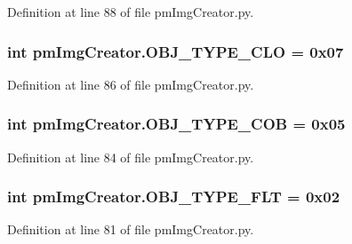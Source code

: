 Definition at line 88 of file pm\-Img\-Creator.\-py.

\hypertarget{namespacepm_img_creator_af1f3b6f0bb8db8e16b64ed3c04ad6215}{
\subsubsection[{O\-B\-J\-\_\-\-T\-Y\-P\-E\-\_\-\-C\-L\-O}]{\setlength{\rightskip}{0pt plus 5cm}int pm\-Img\-Creator.\-O\-B\-J\-\_\-\-T\-Y\-P\-E\-\_\-\-C\-L\-O = 0x07}}\label{namespacepm_img_creator_af1f3b6f0bb8db8e16b64ed3c04ad6215}


Definition at line 86 of file pm\-Img\-Creator.\-py.

\hypertarget{namespacepm_img_creator_ad802353f2974f450f387baf7341370dd}{
\subsubsection[{O\-B\-J\-\_\-\-T\-Y\-P\-E\-\_\-\-C\-O\-B}]{\setlength{\rightskip}{0pt plus 5cm}int pm\-Img\-Creator.\-O\-B\-J\-\_\-\-T\-Y\-P\-E\-\_\-\-C\-O\-B = 0x05}}\label{namespacepm_img_creator_ad802353f2974f450f387baf7341370dd}


Definition at line 84 of file pm\-Img\-Creator.\-py.

\hypertarget{namespacepm_img_creator_a18f7137f0383016c3dedc0c540f90836}{
\subsubsection[{O\-B\-J\-\_\-\-T\-Y\-P\-E\-\_\-\-F\-L\-T}]{\setlength{\rightskip}{0pt plus 5cm}int pm\-Img\-Creator.\-O\-B\-J\-\_\-\-T\-Y\-P\-E\-\_\-\-F\-L\-T = 0x02}}\label{namespacepm_img_creator_a18f7137f0383016c3dedc0c540f90836}


Definition at line 81 of file pm\-Img\-Creator.\-py.


